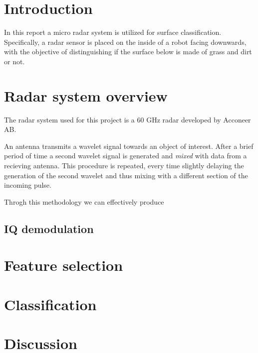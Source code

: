 \documentclass[a4paper, 12pt]{article}
\begin{document}
\section{Introduction}

In this report a micro radar system is utilized for surface classification. Specifically, a radar sensor is placed on the inside of a robot facing downwards, with the objective of distinguishing if the surface below is made of grass and dirt or not.

\section{Radar system overview}

The radar system used for this project is a 60 GHz radar developed by Acconeer AB.

An antenna transmits a wavelet signal towards an object of interest. After a brief period of time a second wavelet signal is generated and \emph{mixed} with data from a recieving antenna. This procedure is repeated, every time slightly delaying the generation of the second wavelet and thus mixing with a different section of the incoming pulse. 

Throgh this methodology we can effectively produce

\subsection{IQ demodulation}



\section{Feature selection}

\section{Classification}

\section{Discussion}
\end{document}
